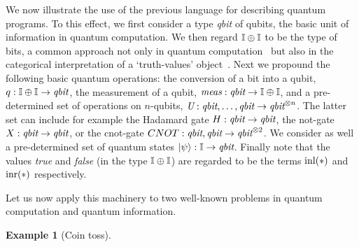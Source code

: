 \documentclass[10pt,a4paper]{amsart}
\theoremstyle{definition}
\theoremstyle{definition}
\newtheorem{example}[definition]{Example}
\theoremstyle{definition}
\theoremstyle{definition}
\theoremstyle{definition}
\theoremstyle{definition}
\begin{document}
We now illustrate the use of the previous language for describing quantum
programs. To this effect, we first consider a type \emph{qbit} of qubits, the
basic unit of information in quantum computation. We then regard $\mathbb{I} \oplus
\mathbb{I}$ to be the type of bits, a common approach not only in quantum
computation~\cite{selinger04} but also in the categorical interpretation of a
`truth-values' object~\cite{johnstone02,cho15}. Next we propound the following
basic quantum operations:  the conversion of a bit into a qubit, $q : \mathbb{I}
\oplus \mathbb{I}  \to \emph{qbit}$, the measurement of a qubit,
$\emph{meas}:\emph{qbit} \to \mathbb{I} \oplus \mathbb{I}$, and a pre-determined set of
operations on $n$-qubits, $\emph{U}:\emph{qbit},\ldots,\emph{qbit} \to
\emph{qbit}^{\otimes n}$. The latter set can include for example the Hadamard
gate $H : \emph{qbit} \to \emph{qbit}$, the not-gate $X : \emph{qbit} \to
\emph{qbit}$, or the cnot-gate $CNOT : \emph{qbit},\emph{qbit} \to
\emph{qbit}^{\otimes 2}$. We consider as well a pre-determined set of quantum
states $\ket{\psi} : \mathbb{I} \to \emph{qbit}$.  Finally note that the values
\emph{true} and \emph{false} (in the type $\mathbb{I} \oplus \mathbb{I}$) are regarded to be 
the terms $\mathrm{inl}(\ast)$ and $\mathrm{inr}(\ast)$ respectively.

Let us now apply this machinery to two well-known problems in quantum computation
and quantum information.

\begin{example}[Coin toss]
~
\end{example}
\end{document}
